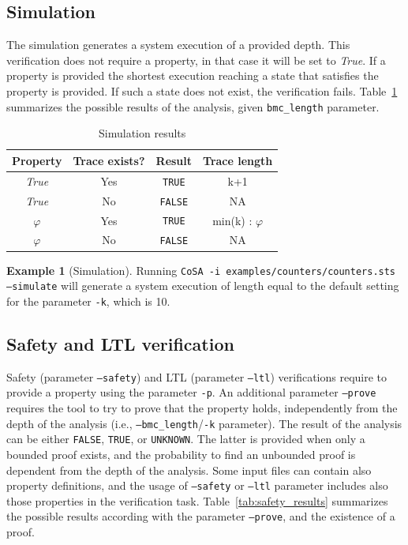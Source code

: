 \documentclass{article}
\theoremstyle{definition}
\newtheorem{example}{Example}[section]
\begin{document}
\subsection{Simulation}
The simulation generates a system execution of a provided depth. This
verification does not require a property, in that case it will be set
to \emph{True}. If a property is provided the shortest execution
reaching a state that satisfies the property is provided. If such a
state does not exist, the verification
fails. Table~\ref{tab:simulation_results} summarizes the possible
results of the analysis, given \texttt{bmc\_length} parameter.

\begin{table}[h]
  \centering
\begin{tabular}{ c c | c c }
  Property & Trace exists? & Result & Trace length \\ \hline 
  \emph{True} & Yes & \texttt{TRUE} & k+1  \\
  \emph{True} & No & \texttt{FALSE} & NA  \\
  $\varphi$ & Yes & \texttt{TRUE} & min(k) : $\varphi$  \\
  $\varphi$ & No & \texttt{FALSE} & NA  \\
\end{tabular}
\caption{Simulation results}
\label{tab:simulation_results}
\end{table}

\begin{example}[Simulation]
  Running \texttt{CoSA -i examples/counters/counters.sts --simulate}
  will generate a system execution of length equal to the default
  setting for the parameter \texttt{-k}, which is 10.
\end{example}

\subsection{Safety and LTL verification}

Safety (parameter \texttt{--safety}) and LTL (parameter
\texttt{--ltl}) verifications require to provide a property using the
parameter \texttt{-p}. An additional parameter \texttt{--prove}
requires the tool to try to prove that the property holds,
independently from the depth of the analysis (i.e.,
\texttt{--bmc\_length}/\texttt{-k} parameter). The result of the
analysis can be either \texttt{FALSE}, \texttt{TRUE}, or
\texttt{UNKNOWN}. The latter is provided when only a bounded proof
exists, and the probability to find an unbounded proof is dependent
from the depth of the analysis. Some input files can contain also
property definitions, and the usage of \texttt{--safety} or
\texttt{--ltl} parameter includes also those properties in the
verification task.  Table~\ref{tab:safety_results} summarizes the
possible results according with the parameter \texttt{--prove}, and
the existence of a proof.
\end{document}
